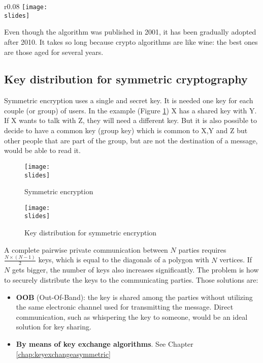 \begin{wrapfigure}{r}{0.08\textwidth}
    \centering
    \texttt{[image: \\slides]}
\end{wrapfigure}

Even though the algorithm was published in 2001, it has been gradually adopted after 2010. It takes so long because crypto algorithms are like wine: the best ones are those aged for several years.


\subsection{Key distribution for symmetric cryptography}
Symmetric  encryption uses a single and secret
key. It is needed one key for each couple (or
group) of users. In the example (Figure \ref*{fig:symmenc}) X has a shared
key with Y. If X wants to talk with Z, they will
need a different key. But it is also possible to
decide to have a common key (group key)
which is common to X,Y and Z but other people
that are part of the group, but are not the
destination of a message, would be able to read
it.
\begin{figure}[h]
    \centering
    \texttt{[image: \\slides]}
    \caption{Symmetric encryption}
    \label{fig:symmenc}
\end{figure}

\begin{figure}[h]
    \centering
    \texttt{[image: \\slides]}
    \caption{Key distribution for symmetric encryption}
    \label{fig:keydistributipmsym}
\end{figure}

A complete pairwise private communication between \(N\) parties requires \(\frac{N \times (N-1)}{2}\) keys, which is equal to the diagonals of a polygon with \(N\) vertices. If \(N\) gets bigger, the number of keys also increases significantly. The problem is how to securely distribute the keys to the communicating parties.
Those solutions are:
\begin{itemize}
    \item \textbf{OOB} (Out-Of-Band): the key is shared among the parties without utilizing the same electronic channel used for transmitting the message. Direct communication, such as whispering the key to someone, would be an ideal solution for key sharing.
    \item \textbf{By means of key exchange algorithms}. See Chapter \ref{chap:keyexchangeasymmetric}
\end{itemize}


